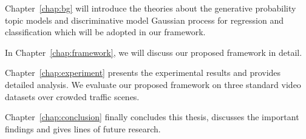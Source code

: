 Chapter~\ref{chap:bg} will introduce the theories about the generative probability topic models and discriminative model Gaussian process for regression and classification which will be adopted in our framework.

In Chapter~\ref{chap:framework}, we will discuss our proposed framework in detail.

Chapter~\ref{chap:experiment} presents the experimental results and provides detailed analysis. We evaluate our proposed framework on three standard video datasets over crowded traffic scenes. 

Chapter~\ref{chap:conclusion} finally concludes this thesis, discusses the important findings
and gives lines of future research. 

